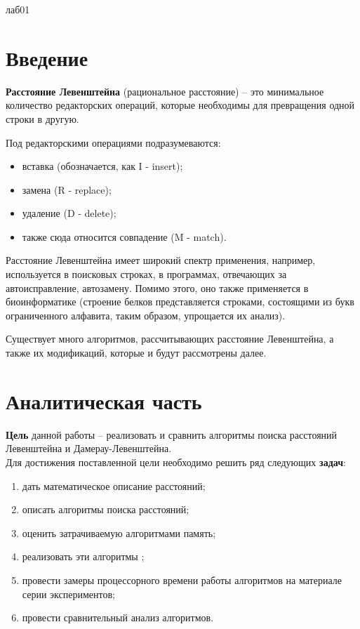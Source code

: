 \documentclass[12pt]{report}
\begin{document}
лаб01


\tableofcontents

\newpage
\chapter*{Введение}

\textbf{Расстояние Левенштейна}  (рациональное расстояние) – это минимальное количество редакторских операций, которые необходимы для превращения одной строки в другую. 

Под редакторскими операциями подразумеваются:
\begin{itemize}
\item вставка (обозначается, как I - insert);
\item замена (R - replace);
\item удаление (D - delete);
\item также сюда относится совпадение (M - match).
\end{itemize}

Расстояние Левенштейна имеет широкий спектр применения, например, используется в поисковых строках, в программах, отвечающих за автоисправление, автозамену. Помимо этого, оно также применяется в биоинформатике (строение белков представляется строками, состоящими из букв ограниченного алфавита, таким образом, упрощается их анализ).

Существует много алгоритмов, рассчитывающих расстояние Левенштейна, а также их модификаций, которые и будут рассмотрены далее.


\chapter{Аналитическая часть}
\textbf{Цель} данной работы – реализовать и сравнить алгоритмы поиска расстояний Левенштейна и Дамерау-Левенштейна.\\

Для достижения поставленной цели необходимо решить ряд следующих \textbf{задач}:
\begin{enumerate}
\item дать математическое описание расстояний;
\item описать алгоритмы поиска расстояний;
\item оценить затрачиваемую алгоритмами память;
\item реализовать эти алгоритмы ;
\item провести замеры процессорного времени работы алгоритмов на материале серии экспериментов;
\item провести сравнительный анализ алгоритмов.
\end{enumerate}
\end{document}
